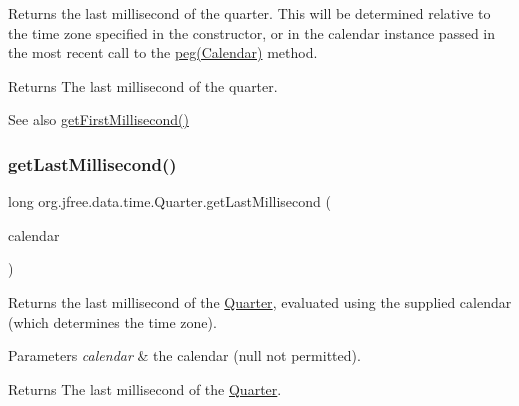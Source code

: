 Returns the last millisecond of the quarter. This will be determined relative to the time zone specified in the constructor, or in the calendar instance passed in the most recent call to the \mbox{\hyperlink{classorg_1_1jfree_1_1data_1_1time_1_1_quarter_a4977c326e2990b40052d09d935f11ce8}{peg(\+Calendar)}} method.

\begin{DoxyReturn}{Returns}
The last millisecond of the quarter.
\end{DoxyReturn}
\begin{DoxySeeAlso}{See also}
\mbox{\hyperlink{classorg_1_1jfree_1_1data_1_1time_1_1_quarter_a64b9346c7db660f54793093a3d496a7c}{get\+First\+Millisecond()}} 
\end{DoxySeeAlso}
\mbox{\label{classorg_1_1jfree_1_1data_1_1time_1_1_quarter_ac12112910ef4b05bb644edfd8fd12769}} 
\subsubsection{\texorpdfstring{get\+Last\+Millisecond()}{getLastMillisecond()}\hspace{0.1cm}{\footnotesize\ttfamily [2/2]}}
{\footnotesize\ttfamily long org.\+jfree.\+data.\+time.\+Quarter.\+get\+Last\+Millisecond (\begin{DoxyParamCaption}\item[{Calendar}]{calendar }\end{DoxyParamCaption})}

Returns the last millisecond of the \mbox{\hyperlink{classorg_1_1jfree_1_1data_1_1time_1_1_quarter}{Quarter}}, evaluated using the supplied calendar (which determines the time zone).


\begin{DoxyParams}{Parameters}
{\em calendar} & the calendar ({\ttfamily null} not permitted).\\
\hline
\end{DoxyParams}
\begin{DoxyReturn}{Returns}
The last millisecond of the \mbox{\hyperlink{classorg_1_1jfree_1_1data_1_1time_1_1_quarter}{Quarter}}.
\end{DoxyReturn}

